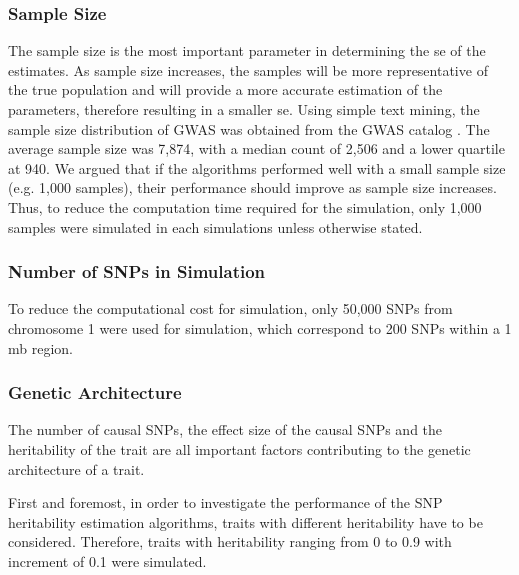 		\subsubsection{Sample Size}
			The sample size is the most important parameter in determining the \gls{se} of the estimates. 
			As sample size increases, the samples will be more representative of the true population and will provide a more accurate estimation of the parameters, therefore resulting in a smaller \gls{se}.
			Using simple text mining, the sample size distribution of \gls{GWAS} was obtained from the \gls{GWAS} catalog \citep{Welter2014}.
			The average sample size was 7,874, with a median count of 2,506 and a lower quartile at 940. 
			We argued that if the algorithms performed well with a small sample size (e.g. 1,000 samples), their performance should improve as sample size increases.
			Thus, to reduce the computation time required for the simulation, only 1,000 samples were simulated in each simulations unless otherwise stated.
				
%			
		\subsubsection{Number of SNPs in Simulation}
			To reduce the computational cost for simulation, only 50,000 \glspl{SNP} from chromosome 1 were used for simulation, which correspond to 200 \glspl{SNP} within a 1 \gls{mb} region.
			
		\subsubsection{Genetic Architecture}
			The number of causal \glspl{SNP}, the effect size of the causal \glspl{SNP} and the heritability of the trait are all important factors contributing to the genetic architecture of a trait. 
		
			First and foremost, in order to investigate the performance of the \gls{SNP} heritability estimation algorithms, traits with different heritability have to be considered.
			Therefore, traits with heritability ranging from 0 to 0.9 with increment of 0.1 were simulated. 
		
